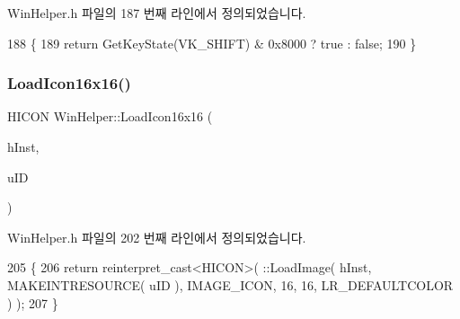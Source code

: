 Win\+Helper.\+h 파일의 187 번째 라인에서 정의되었습니다.


\begin{DoxyCode}
188     \{
189       \textcolor{keywordflow}{return} GetKeyState(VK\_SHIFT) & 0x8000 ? true : \textcolor{keyword}{false};
190     \}
\end{DoxyCode}
\mbox{\label{namespace_win_helper_a2ce42916bda6434a5432df1ea8071183}} 
\subsubsection{\texorpdfstring{Load\+Icon16x16()}{LoadIcon16x16()}}
{\footnotesize\ttfamily H\+I\+C\+ON Win\+Helper\+::\+Load\+Icon16x16 (\begin{DoxyParamCaption}\item[{H\+I\+N\+S\+T\+A\+N\+CE}]{h\+Inst,  }\item[{U\+I\+NT}]{u\+ID }\end{DoxyParamCaption})\hspace{0.3cm}{\ttfamily [inline]}}



Win\+Helper.\+h 파일의 202 번째 라인에서 정의되었습니다.


\begin{DoxyCode}
205     \{
206       \textcolor{keywordflow}{return} \textcolor{keyword}{reinterpret\_cast<}HICON\textcolor{keyword}{>}( ::LoadImage( hInst, MAKEINTRESOURCE( uID ), IMAGE\_ICON, 16, 16, 
      LR\_DEFAULTCOLOR ) );
207     \}
\end{DoxyCode}
